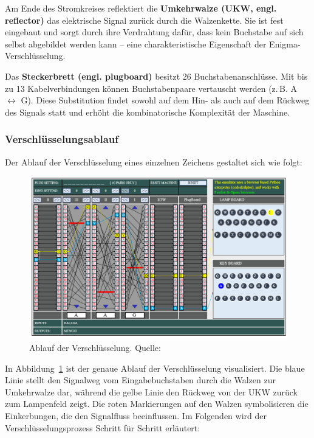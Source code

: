 \documentclass[12pt, ngerman, a4paper, numbers=noenddot]{article}
\begin{document}
Am Ende des Stromkreises reflektiert die \textbf{Umkehrwalze (UKW, engl. reflector)} das elektrische Signal zurück durch die Walzenkette. Sie ist fest eingebaut und sorgt durch ihre Verdrahtung dafür, dass kein Buchstabe auf sich selbst abgebildet werden kann – eine charakteristische Eigenschaft der Enigma-Verschlüsselung.

Das \textbf{Steckerbrett (engl. plugboard)} besitzt 26 Buchstabenanschlüsse. Mit bis zu 13 Kabelverbindungen können Buchstabenpaare vertauscht werden (z.\,B. A $\leftrightarrow$ G). Diese Substitution findet sowohl auf dem Hin- als auch auf dem Rückweg des Signals statt und erhöht die kombinatorische Komplexität der Maschine.


\newpage
\subsubsection{Verschlüsselungsablauf}

Der Ablauf der Verschlüsselung eines einzelnen Zeichens gestaltet sich wie folgt:

\begin{figure}[H]
	\centering
	\includegraphics[width=1\textwidth]{bilder/simulator.png}
	\caption{Ablauf der Verschlüsselung. Quelle: \cite{piotte:enigma}}
	\label{fig:verschluesselungsablauf}
\end{figure}



In Abbildung~\ref{fig:verschluesselungsablauf} ist der genaue Ablauf der Verschlüsselung visualisiert. Die blaue Linie stellt den Signalweg vom Eingabebuchstaben durch die Walzen zur Umkehrwalze dar, während die gelbe Linie den Rückweg von der UKW zurück zum Lampenfeld zeigt. Die roten Markierungen auf den Walzen symbolisieren die Einkerbungen, die den Signalfluss beeinflussen. Im Folgenden wird der Verschlüsselungsprozess Schritt für Schritt erläutert:
\end{document}
